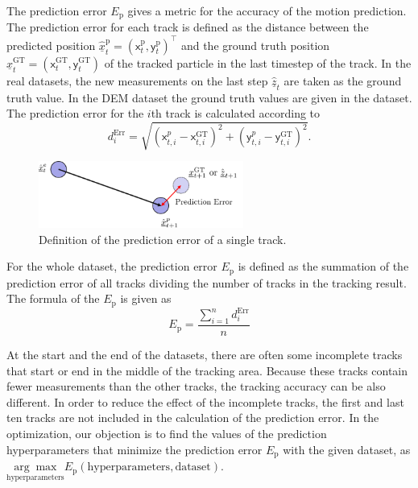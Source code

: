 The prediction error $E_{\mathrm{p}}$ gives a metric for the accuracy of the motion prediction. The prediction error for each track is defined as the distance between the predicted position $\hat{\underline{x}}^\mathrm{p}_{t} = (\mathsf{x}_{t}^\mathrm{p},\mathsf{y}_{t}^\mathrm{p})^\top$ and the ground truth position  $\underline{x}^{\mathrm{GT}}_{t} = (\mathsf{x}_{t}^{\mathrm{GT}},\mathsf{y}_{t}^{\mathrm{GT}})$ of the tracked particle in the last timestep of the track. In the real datasets, the new measurements on the last step $\hat{\underline{z}}_{t}$ are taken as the ground truth value. In the DEM dataset the ground truth values are given in the dataset. The prediction error for the $i$th track is calculated according to
\begin{equation}
    d^{\mathrm{Err}}_{i}=\sqrt{(\mathsf{x}_{t,i}^{p}-\mathsf{x}_{t,i}^{\mathrm{GT}})^{2}+(\mathsf{y}_{t,i}^{p}-\mathsf{y}_{t,i}^{\mathrm{GT}})^{2}}.
\end{equation}
\begin{figure}[htbp]
\centering
\includegraphics[width=0.6\textwidth]{figures/KF/prediction error.png}
\caption{Definition of the prediction error of a single track.}
\label{prediction error}
\end{figure}


For the whole dataset, the prediction error $E_{\mathrm{p}}$ is defined as the summation of the prediction error of all tracks dividing the number of tracks in the tracking result. The formula of the $E_{\mathrm{p}}$ is given as 
\begin{equation}
    E_{\mathrm{p}} = \frac{\sum_{i=1}^{n} d^{\mathrm{Err}}_{i}}{n}
\end{equation}


At the start and the end of the datasets, there are often some incomplete tracks that start or end in the middle of the tracking area. Because these tracks contain fewer measurements than the other tracks, the tracking accuracy can be also different. In order to reduce the effect of the incomplete tracks, the first and last ten tracks are not included in the calculation of the prediction error. In the optimization, our objection is to find the values of the prediction hyperparameters that minimize the prediction error $E_{\mathrm{p}}$ with the given dataset, as $\underset{\text{hyperparameters}}{\arg\max} E_{\mathrm{p}}(\mathrm{hyperparameters}, \textrm{dataset})$.


